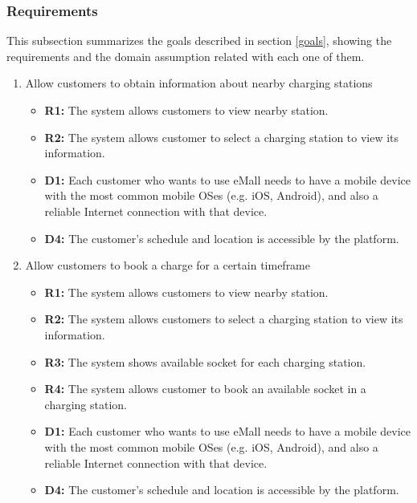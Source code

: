 \subsubsection{Requirements}
This subsection summarizes the goals described in section \ref{goals}, showing the requirements and the domain assumption related with each one of them.
\begin{enumerate}[label=\textbf{-G\arabic*}:]
    \item {Allow customers to obtain information about nearby charging stations
          \begin{itemize}
              \item \textbf{R1:} The system allows customers to view nearby station.
              \item \textbf{R2:} The system allows customer to select a charging station to view its information.
              \item \textbf{D1:} Each customer who wants to use eMall needs to have a mobile device with the most common mobile OSes (e.g. iOS, Android), and also a reliable Internet connection with that device.
              \item \textbf{D4:} The customer's schedule and location is accessible by the platform.
          \end{itemize}
          }
    \item {Allow customers to book a charge for a certain timeframe
          \begin{itemize}
              \item \textbf{R1:} The system allows customers to view nearby station.  
              \item\textbf{R2:} The system allows customers to select a charging station to view its information.
              \item \textbf{R3:} The system shows available socket for each charging station.
              \item \textbf{R4:} The system allows customer to book an available socket in a charging station.
              \item \textbf{D1:} Each customer who wants to use eMall needs to have a mobile device with the most common mobile OSes (e.g. iOS, Android), and also a reliable Internet connection with that device.
              \item \textbf{D4:} The customer's schedule and location is accessible by the platform.
                            

\end{itemize}}
\end{enumerate}
